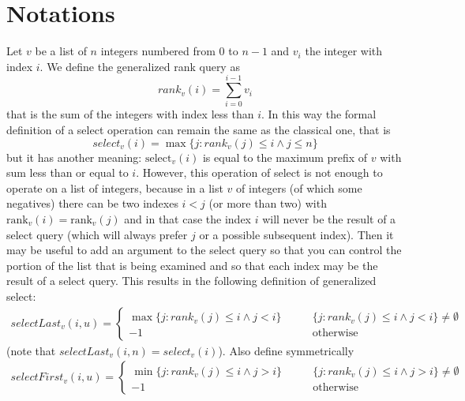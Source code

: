\documentclass{article}
\begin{document}
\section{Notations}
Let $v$ be a list of $n$ integers numbered from $0$ to $n-1$ and $v_i$ the integer with index $i$. We define the generalized rank query as
    $$\mathit{rank}_v(i)=\sum_{i=0}^{i-1}v_i$$
that is the sum of the integers with index less than $i$. In this way the formal definition of a select operation can remain the same as the classical one, that is
    $$\mathit{select}_v(i)=\max\{j : \mathit{rank}_v(j) \leq i \land j \leq n\}$$
but it has another meaning: $\text{select}_v(i)$ is equal to the maximum prefix of $v$ with sum less than or equal to $i$. However, this operation of select is not enough to operate on a list of integers, because in a list $v$ of integers (of which some negatives) there can be two indexes $i < j$ (or more than two) with $\text{rank}_v(i) = \text{rank}_v(j)$ and in that case the index $i$ will never be the result of a select query (which will always prefer $j$ or a possible subsequent index). Then it may be useful to add an argument to the select query so that you can control the portion of the list that is being examined and so that each index may be the result of a select query. This results in the following definition of generalized select:
    \begin{align*}
        \mathit{selectLast}_v(i,u)=
            \begin{cases}
                \max\{j : \mathit{rank}_v(j)\leq i \land j < i\} \qquad &\{j : \mathit{rank}_v(j)\leq i \land j < i\} \neq \emptyset \\
                -1 \qquad &\text{otherwise}
            \end{cases}
    \end{align*}
(note that $\mathit{selectLast}_v(i,n)=\mathit{select}_v(i)$). Also define symmetrically
    \begin{align*}
        \mathit{selectFirst}_v(i,u)=
            \begin{cases}
                \min\{j : \mathit{rank}_v(j) \leq i \land j > i\} \qquad &\{j : \mathit{rank}_v(j) \leq i \land j > i\}\neq \emptyset \\
                -1 \qquad &\text{otherwise}
            \end{cases}
    \end{align*}

    
\end{document}
